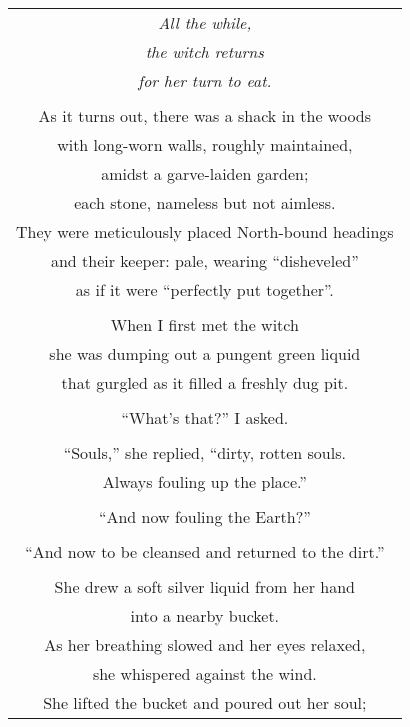 \documentclass{article}
\begin{document}
\begin{center}
\begin{longtable}{c}
\textit{All the while,} \\
\textit{the witch returns} \\
\textit{for her turn to eat.} \\
\\
As it turns out, there was a shack in the woods \\
with long-worn walls, roughly maintained, \\
amidst a garve-laiden garden; \\
each stone, nameless but not aimless. \\
They were meticulously placed North-bound headings \\
and their keeper: pale, wearing ``disheveled'' \\
as if it were ``perfectly put together''. \\
\\
When I first met the witch \\
she was dumping out a pungent green liquid \\
that gurgled as it filled a freshly dug pit. \\
\\
``What's that?'' I asked. \\
\\
``Souls,'' she replied, ``dirty, rotten souls. \\
Always fouling up the place.'' \\
\\
``And now fouling the Earth?'' \\
\\
``And now to be cleansed and returned to the dirt.'' \\
\\
She drew a soft silver liquid from her hand \\
into a nearby bucket. \\
As her breathing slowed and her eyes relaxed, \\
she whispered against the wind. \\
She lifted the bucket and poured out her soul; \\

\end{longtable}
\end{center}
\end{document}
